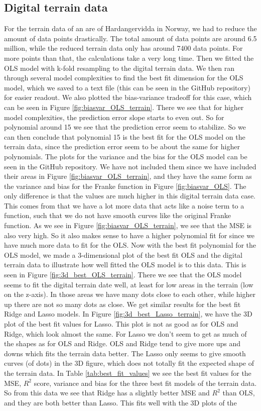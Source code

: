 \documentclass[12pt,a4paper,english]{article}
\begin{document}
\subsection{Digital terrain data}
For the terrain data of an are of Hardangervidda in Norway, we had to reduce the amount of data points drastically. The total amount of data points are around 6.5 million, while the reduced terrain data only has around 7400 data points. For more points than that, the calculations take a very long time. Then we fitted the OLS model with k-fold resampling to the digital terrain data. We then ran through several model complexities to find the best fit dimension for the OLS model, which we saved to a text file (this can be seen in the GitHub repository) for easier readout. We also plotted the bias-variance tradeoff for this case, which can be seen in Figure \ref{fig:biasvar_OLS_terrain}. There we see that for higher model complexities, the prediction error slope starts to even out. So for polynomial around 15 we see that the prediction error seem to stabilize. So we can then conclude that polynomial 15 is the best fit for the OLS model on the terrain data, since the prediction error seem to be about the same for higher polynomials. The plots for the variance and the bias for the OLS model can be seen in the GitHub repository. We have not included them since we have included their areas in Figure \ref{fig:biasvar_OLS_terrain}, and they have the same form as the variance and bias for the Franke function in Figure \ref{fig:biasvar_OLS}. The only difference is that the values are much higher in this digital terrain data case. This comes from that we have a lot more data that acts like a noise term to a function, such that we do not have smooth curves like the original Franke function. As we see in Figure \ref{fig:biasvar_OLS_terrain}, we see that the MSE is also very high. So it also makes sense to have a higher polynomial fit for since we have much more data to fit for the OLS. Now with the best fit polynomial for the OLS model, we made a 3-dimensional plot of the best fit OLS and the digital terrain data to illustrate how well fitted the OLS model is to this data. This is seen in Figure \ref{fig:3d_best_OLS_terrain}. There we see that the OLS model seems to fit the digital terrain date well, at least for low areas in the terrain (low on the z-axis). In those areas  we have many dots close to each other, while higher up there are not so many dots as close. We get similar results for the best fit Ridge and Lasso models. In Figure \ref{fig:3d_best_Lasso_terrain}, we have the 3D plot of the best fit values for Lasso. This plot is not as good as for OLS and Ridge, which look almost the same. For Lasso we don't seem to get as much of the shapes as for OLS and Ridge. OLS and Ridge tend to give more ups and downs which fits the terrain data better. The Lasso only seems to give smooth curves (of dots) in the 3D figure, which does not totally fit the expected shape of the terrain data. In Table \ref{tab:best_fit_values} we see the best fit values for the MSE, $R^2$ score, variance and bias for the three best fit models of the terrain data. So from this data we see that Ridge has a slightly better MSE and $R^2$ than OLS, and they are both better than Lasso. This fits well with the 3D plots of the 
\end{document}
